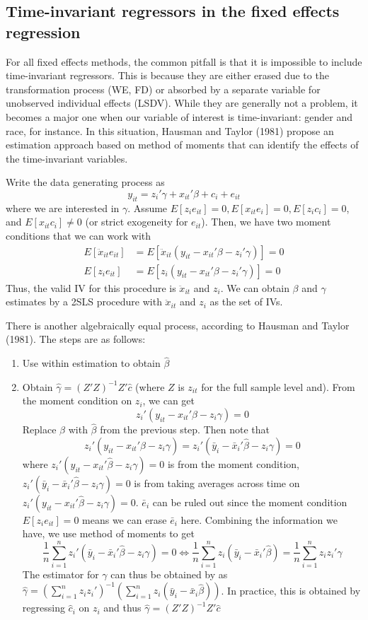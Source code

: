 \documentclass[12pt]{article}
\theoremstyle{definition}
\theoremstyle{property}
\theoremstyle{assumption}
\theoremstyle{example}
\theoremstyle{comment}
\begin{document}
\subsection{Time-invariant regressors in the fixed effects regression}
For all fixed effects methods, the common pitfall is that it is impossible to include time-invariant regressors. This is because they are either erased due to the transformation process (WE, FD) or absorbed by a separate variable for unobserved individual effects (LSDV). While they are generally not a problem, it becomes a major one when our variable of interest is time-invariant: gender and race, for instance. In this situation, Hausman and Taylor (1981) propose an estimation approach based on method of moments that can identify the effects of the time-invariant variables. 
\par
Write the data generating process as
\[
y_{it}=z_{i}'\gamma+x_{it}'\beta+c_i+e_{it}
\]
where we are interested in $\gamma$. Assume $E[z_ie_{it}]=0, E[x_{it}e_i]=0, E[z_ic_i]=0$, and $E[x_{it}c_i]\neq0$ (or strict exogeneity for $e_{it}$). Then, we have two moment conditions that we can work with
\[
\begin{aligned}
E[\ddot{x}_{it}e_{it}]&=E[\ddot{x}_{it}(y_{it}-x_{it}'\beta-z_i'\gamma)]=0\\
E[z_{i}e_{it}]&=E[z_{i}(y_{it}-x_{it}'\beta-z_i'\gamma)]=0
\end{aligned}
\]
Thus, the valid IV for this procedure is $\ddot{x}_{it}$ and $z_i$. We can obtain $\beta$ and $\gamma$ estimates by a 2SLS procedure with $\ddot{x}_{it}$ and $z_i$ as the set of IVs.
\par
There is another algebraically equal process, according to Hausman and Taylor (1981). The steps are as follows:
\begin{enumerate}
\item Use within estimation to obtain $\hat{\beta}$
\item Obtain $\hat{\gamma}=(Z'Z)^{-1}Z'\hat{c}$ (where $Z$ is $z_{it}$ for the full sample level and). From the moment condition on $z_{i}$, we can get
\[
z_i'(y_{it}-x_{it}'\beta-z_i\gamma)=0
\]
Replace $\beta$ with $\hat{\beta}$ from the previous step. Then note that
\[
z_i'(y_{it}-x_{it}'\hat{\beta}-z_i\gamma)=z_i'(\bar{y}_{i}-\bar{x}_{i}'\hat{\beta}-z_i\gamma)=0
\]
where $z_i'(y_{it}-x_{it}'\hat{\beta}-z_i\gamma)=0$ is from the moment condition, $z_i'(\bar{y}_{i}-\bar{x}_{i}'\hat{\beta}-z_i\gamma)=0$ is from taking averages across time on $z_i'(y_{it}-x_{it}'\hat{\beta}-z_i\gamma)=0$. $\bar{e}_i$ can be ruled out since the moment condition $E[z_{i}e_{it}]=0$ means we can erase $\bar{e}_i$ here. Combining the information we have, we use method of moments to get
\[
\frac{1}{n}\sum_{i=1}^n z_i'(\bar{y}_{i}-\bar{x}_{i}'\hat{\beta}-z_i\gamma)=0 \iff \frac{1}{n}\sum_{i=1}^nz_i(\bar{y}_i-\bar{x}_i'\hat{\beta})=\frac{1}{n}\sum_{i=1}^n z_iz_i'\gamma
\]
The estimator for $\gamma$ can thus be obtained by as $\hat{\gamma}=\left(\sum_{i=1}^n z_iz_i'\right)^{-1}\left(\sum_{i=1}^nz_i (\bar{y}_i-\bar{x}_i\hat{\beta})\right)$. In practice, this is obtained by regressing $\hat{c}_i$ on $z_i$ and thus $\hat{\gamma}=(Z'Z)^{-1} Z'\hat{c}$
\end{enumerate}
\end{document}
